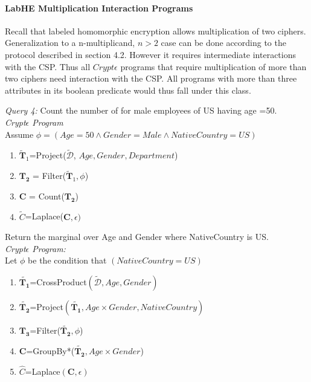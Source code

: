 \paragraph{\textbf{LabHE Multiplication Interaction Programs}}
Recall that labeled homomorphic encryption allows multiplication of two ciphers. Generalization to a n-multiplicand, $n > 2$ case can be done according to the protocol described in section 4.2. However it requires intermediate interactions with the \textsf{CSP}. Thus all $Crypt\epsilon$ programs that require multiplication of more than two ciphers need interaction with the \textsf{CSP}. 
All programs with more than three attributes in its boolean predicate would thus fall under this class.
\begin{exmp}\textit{Query 4:} Count the number of for male employees of US having age =50. \\\textit{Crypt$\epsilon$ Program} \\Assume $\phi=(Age=50 \wedge Gender=Male \wedge NativeCountry=US)$ \end{exmp} \begin{enumerate} \item $\mathbf{\tilde{T}}_1$=\textsf{Project}($\boldsymbol{\tilde{\mathcal{D}}}$, $Age,Gender,Department$)  \item  $\mathbf{T_2}$ = \textsf{Filter}($\mathbf{\tilde{T}}_1,\phi$)\item $\mathbf{C}$ = \textsf{Count}($\mathbf{T_2}$) \item $\tilde{C}$=\textsf{Laplace}($\mathbf{C},\epsilon)$\end{enumerate}
\begin{exmp}Return the marginal over Age and Gender where NativeCountry is US. \\\textit{Crypt$\epsilon$ Program:}\\ Let $\phi$ be the condition that $(NativeCountry=US) $  \begin{enumerate}\item $\tilde{\mathbf{T_1}}$=\textsf{CrossProduct}$(\boldsymbol{\tilde{\mathcal{D}}},Age,Gender)$ \item $\tilde{\mathbf{T_2}}$=\textsf{Project}$(\tilde{\mathbf{T_1}}, Age \times Gender, NativeCountry)$ \item $\mathbf{T_3}$=\textsf{Filter}($\tilde{\mathbf{T_2}},\phi$)\item $\mathbf{C}$=\textsf{GroupBy*}($\tilde{\mathbf{T_2}},Age\times Gender$)\item $\hat{C}$=\textsf{Laplace}$(\mathbf{C},\epsilon)$ \end{enumerate}\end{exmp}
